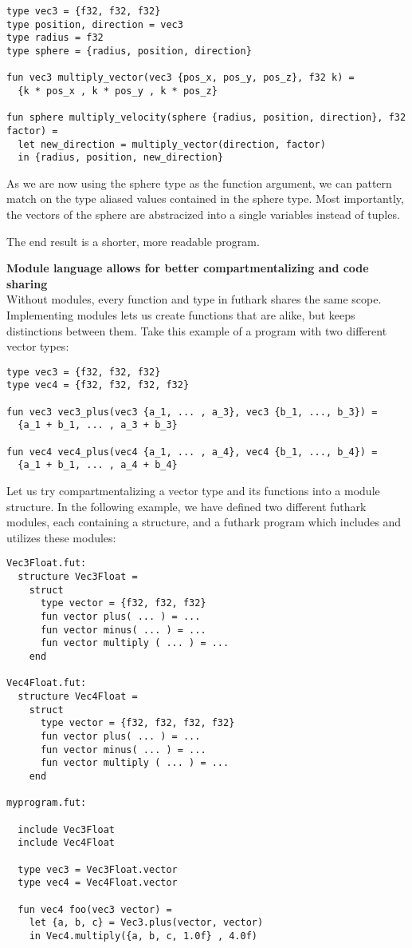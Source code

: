\begin{verbatim}
type vec3 = {f32, f32, f32}
type position, direction = vec3 
type radius = f32
type sphere = {radius, position, direction}

fun vec3 multiply_vector(vec3 {pos_x, pos_y, pos_z}, f32 k) =
  {k * pos_x , k * pos_y , k * pos_z}

fun sphere multiply_velocity(sphere {radius, position, direction}, f32 factor) =
  let new_direction = multiply_vector(direction, factor)
  in {radius, position, new_direction}
\end{verbatim}

As we are now using the sphere type as the function argument, we can pattern
match on the type aliased values contained in the sphere type.
Most importantly, the vectors of the sphere are abstracized into a single variables
instead of tuples.

The end result is a shorter, more readable program. %


\textbf{Module language allows for better compartmentalizing and code sharing} \\
Without modules, every function and type in futhark shares the same scope.
Implementing modules lets us create functions that are alike, but keeps
distinctions between them.
Take this example of a program with two different vector types:

\begin{verbatim}
type vec3 = {f32, f32, f32}
type vec4 = {f32, f32, f32, f32}

fun vec3 vec3_plus(vec3 {a_1, ... , a_3}, vec3 {b_1, ..., b_3}) =
  {a_1 + b_1, ... , a_3 + b_3}

fun vec4 vec4_plus(vec4 {a_1, ... , a_4}, vec4 {b_1, ..., b_4}) =
  {a_1 + b_1, ... , a_4 + b_4}
\end{verbatim}

Let us try compartmentalizing a vector type and its functions into a module
structure.
In the following example, we have defined two different futhark modules, each
containing a structure,
and a futhark program which includes and utilizes these modules:
\begin{verbatim}
Vec3Float.fut:
  structure Vec3Float = 
    struct
      type vector = {f32, f32, f32}
      fun vector plus( ... ) = ...
      fun vector minus( ... ) = ...
      fun vector multiply ( ... ) = ...
    end

Vec4Float.fut:
  structure Vec4Float = 
    struct
      type vector = {f32, f32, f32, f32}
      fun vector plus( ... ) = ...
      fun vector minus( ... ) = ...
      fun vector multiply ( ... ) = ...
    end
  
myprogram.fut:

  include Vec3Float
  include Vec4Float

  type vec3 = Vec3Float.vector
  type vec4 = Vec4Float.vector
  
  fun vec4 foo(vec3 vector) = 
    let {a, b, c} = Vec3.plus(vector, vector)
    in Vec4.multiply({a, b, c, 1.0f} , 4.0f)
\end{verbatim}

